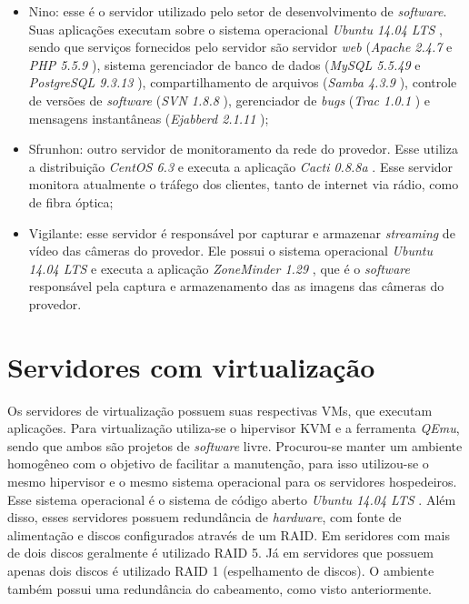 \begin{itemize}
 \item Nino: esse é o servidor utilizado pelo setor de desenvolvimento de \textit{software}. Suas aplicações executam sobre o sistema operacional 
 \textit{Ubuntu 14.04 \ac{LTS}} \cite{ubuntu}, sendo que serviços fornecidos pelo servidor são servidor \textit{web} (\textit{Apache 2.4.7} 
 \cite{apache} e \textit{\ac{PHP} 5.5.9} \cite{php}), sistema gerenciador de banco de dados (\textit{MySQL 5.5.49} \cite{mysql} e 
 \textit{PostgreSQL 9.3.13} \cite{postgres}), compartilhamento de arquivos (\textit{Samba 4.3.9} \cite{samba}), controle de versões de 
 \textit{software} (\textit{\ac{SVN} 1.8.8} \cite{svn}), gerenciador de \textit{bugs} (\textit{Trac 1.0.1} \cite{trac}) e mensagens instantâneas 
 (\textit{Ejabberd 2.1.11} \cite{ejabberd});
 
 \item Sfrunhon: outro servidor de monitoramento da rede do provedor. Esse utiliza a distribuição \textit{CentOS 6.3} \cite{centos} e executa a 
 aplicação \textit{Cacti 0.8.8a} \cite{cacti}. Esse servidor monitora atualmente o tráfego dos clientes, tanto de internet via rádio, como de 
 fibra óptica;
 
 \item Vigilante: esse servidor é responsável por capturar e armazenar \textit{streaming} de vídeo das câmeras do provedor. Ele possui o sistema 
 operacional \textit{Ubuntu 14.04 \ac{LTS}} \cite{ubuntu} e executa a aplicação \textit{ZoneMinder 1.29} \cite{zoneminder}, que é o 
 \textit{software} responsável pela captura e armazenamento das as imagens das câmeras do provedor.
\end{itemize}

\section{Servidores com virtualização}
\label{section:servvirt}

Os servidores de virtualização possuem suas respectivas \ac{VM}s, que executam aplicações. Para virtualização utiliza-se o hipervisor 
\ac{KVM} e a ferramenta \textit{QEmu}, sendo que ambos são projetos de \textit{software} livre. Procurou-se manter um ambiente homogêneo 
com o objetivo de facilitar a manutenção, para isso utilizou-se o mesmo hipervisor e o mesmo sistema operacional para os servidores hospedeiros. 
Esse sistema operacional é o sistema de código aberto \textit{Ubuntu 14.04 \ac{LTS}} \cite{ubuntu}.
Além disso, esses servidores possuem redundância de \textit{hardware}, com fonte de alimentação e discos configurados através de um \ac{RAID}. 
Em seridores com mais de dois discos geralmente é utilizado \ac{RAID} 5. Já em servidores que possuem apenas dois discos é utilizado \ac{RAID} 1 
(espelhamento de discos). O ambiente também possui uma redundância do cabeamento, como visto anteriormente.


